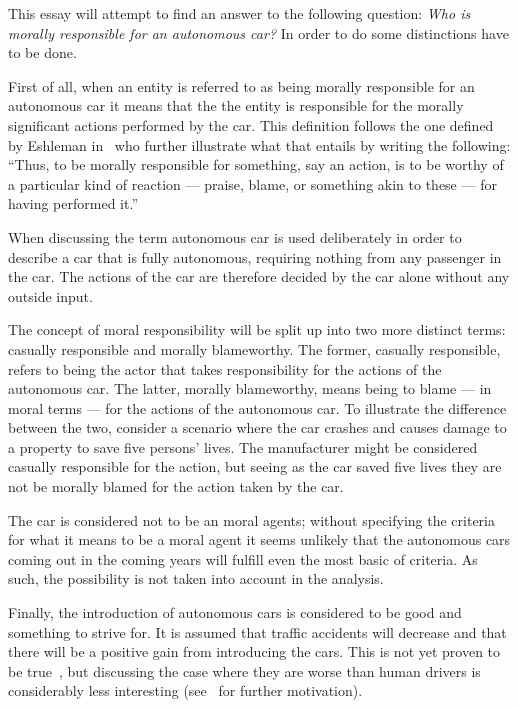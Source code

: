 This essay will attempt to find an answer to the following question:
\textit{Who is morally responsible for an autonomous car?}
In order to do some distinctions have to be done.

First of all, when an entity is referred to as being morally responsible for an
autonomous car it means that the the entity is responsible for the morally
significant actions performed by the car. This definition follows the one
defined by Eshleman in~\cite{eshleman_2014_moral_mra} who further illustrate
what that entails by writing the following:
``Thus, to be morally responsible for something, say an action, is to be
worthy of a particular kind of reaction --- praise, blame, or something akin to
these --- for having performed it.''

When discussing the term autonomous car is used deliberately in
order to describe a car that is fully autonomous, requiring nothing from any
passenger in the car. The actions of the car are therefore decided by the car
alone without any outside input.

The concept of moral responsibility will be split up into two more distinct
terms: casually responsible and morally blameworthy. The former, casually
responsible, refers to being the actor that takes responsibility for the actions
of the autonomous car. The latter, morally blameworthy, means being to blame ---
in moral terms --- for the actions of the autonomous car. To illustrate the
difference between the two, consider a scenario where the car crashes and causes
damage to a property to save five persons' lives. The manufacturer might be
considered casually responsible for the action, but seeing as the car saved five
lives they are not be morally blamed for the action taken by the car.

The car is considered not to be an moral agents; without specifying the criteria
for what it means to be a moral agent it seems unlikely that the autonomous cars
coming out in the coming years will fulfill even the most basic of criteria. As
such, the possibility is not taken into account in the analysis.

Finally, the introduction of autonomous cars is considered to be good
and something to strive for. It is assumed that traffic accidents will decrease
and that there will be a positive gain from introducing the cars. This is not
yet proven to be true~\cite{schoettle_2015_preliminary_apaorcisv}, but discussing
the case where they are worse than human drivers is considerably less
interesting (see~\cite{marchant_2012_coming_ccbavatlst} for further motivation).